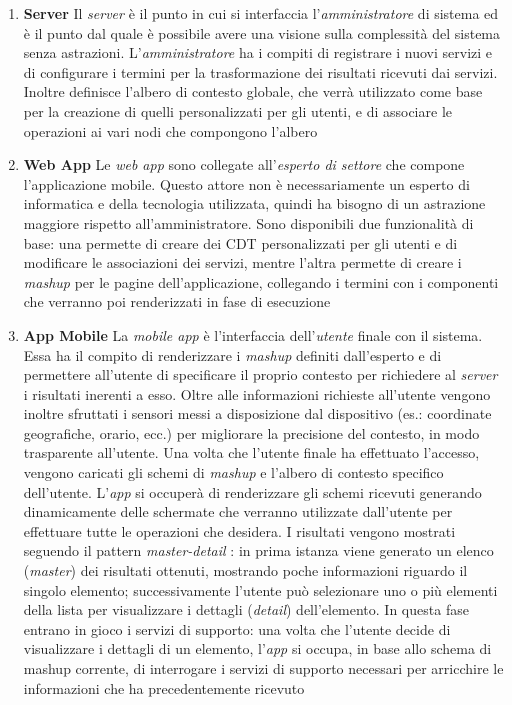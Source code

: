 \begin{enumerate}
	\item \textbf{Server}
	Il \emph{server} è il punto in cui si interfaccia l'\emph{amministratore} di sistema ed è il punto dal quale è possibile avere una visione sulla complessità del sistema senza astrazioni. L'\emph{amministratore} ha i compiti di registrare i nuovi servizi e di configurare i termini per la trasformazione dei risultati ricevuti dai servizi. Inoltre definisce l'albero di contesto globale, che verrà utilizzato come base per la creazione di quelli personalizzati per gli utenti, e di associare le operazioni ai vari nodi che compongono l'albero
	\item \textbf{Web App}
	Le \emph{web app} sono collegate all'\emph{esperto di settore} che compone l'applicazione mobile. Questo attore non è necessariamente un esperto di informatica e della tecnologia utilizzata, quindi ha bisogno di un astrazione maggiore rispetto all'amministratore. Sono disponibili due funzionalità di base: una permette di creare dei CDT personalizzati per gli utenti e di modificare le associazioni dei servizi, mentre l'altra permette di creare i \emph{mashup} per le pagine dell'applicazione, collegando i termini con i componenti che verranno poi renderizzati in fase di esecuzione
	\item \textbf{App Mobile}
	La \emph{mobile app} è l'interfaccia dell'\emph{utente} finale con il sistema. Essa ha il compito di renderizzare i \emph{mashup} definiti dall'esperto e di permettere all'utente di specificare il proprio contesto per richiedere al \emph{server} i risultati inerenti a esso. Oltre alle informazioni richieste all'utente vengono inoltre sfruttati i sensori messi a disposizione dal dispositivo (es.: coordinate geografiche, orario, ecc.) per migliorare la precisione del contesto, in modo trasparente all'utente.
	Una volta che l'utente finale ha effettuato l'accesso, vengono caricati gli schemi di \emph{mashup} e l'albero di contesto specifico dell'utente. L'\emph{app} si occuperà di renderizzare gli schemi ricevuti generando dinamicamente delle schermate che verranno utilizzate dall'utente per effettuare tutte le operazioni che desidera.
	I risultati vengono mostrati seguendo il pattern \emph{master-detail} \cite{molina2002user}: in prima istanza viene generato un elenco (\emph{master}) dei risultati ottenuti, mostrando poche informazioni riguardo il singolo elemento; successivamente l'utente può selezionare uno o più elementi della lista per visualizzare i dettagli (\emph{detail}) dell'elemento. In questa fase entrano in gioco i servizi di supporto: una volta che l'utente decide di visualizzare i dettagli di un elemento, l'\emph{app} si occupa, in base allo schema di mashup corrente, di interrogare i servizi di supporto necessari per arricchire le informazioni che ha precedentemente ricevuto
\end{enumerate}

